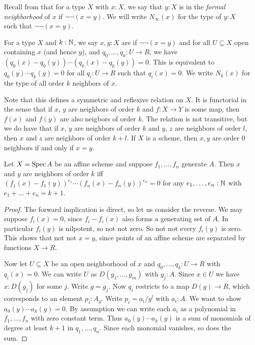 Recall from \cite{draft} that for a type $X$ with $x : X$, we say that $y : X$ is in the
\emph{formal neighborhood} of $x$ if $\neg \neg (x = y)$.
We will write $N_\infty(x)$ for the type of $y : X$ such that $\neg \neg(x = y)$.

\begin{definition}
For a type $X$ and $k : \mathbb{N}$, we say $x, y : X$ are 
if $\neg \neg (x = y)$ and for all $U \subseteq X$ open containing $x$ (and hence $y$), 
and $q_0,\ldots,q_k : U \to R$,
we have $(q_0(x) - q_0(y))\cdots (q_k(x)-q_k(y)) = 0$.
This is equivalent to $q_0(y)\cdots q_k(y) = 0$ for all $q_i : U \to R$ such that $q_i(x) = 0$.
We write $N_k(x)$ for the type of all order $k$ neighbors of $x$.
\end{definition}
Note that this defines a symmetric and reflexive relation on $X$. It is functorial in the
sense that if $x$, $y$ are neighbors of order $k$ and $f : X \to Y$ is some map,
then $f(x)$ and $f(y)$ are also neigbors of order $k$.
The relation is not transitive, but we do have that if $x$, $y$ are neighbors of order
$k$ and $y$, $z$ are neighbors of order $l$, then $x$ and $z$ are neighbors of order
$k+l$. If $X$ is a scheme, then $x,y$ are order $0$ neighbors if and only if $x = y$.

\begin{lemma}\label{neighbor-criterion}
Let $X = \operatorname{Spec} A$ be an affine scheme and suppose $f_1,\ldots,f_n$ generate $A$.
Then $x$ and $y$ are neighbors of order $k$ iff 
$(f_1(x) - f_1(y))^{e_1} \cdots (f_n(x) - f_n(y))^{e_n} = 0$ for any $e_1,\ldots,e_n : \mathbb{N}$
with $e_1 + \ldots + e_n = k+1$.
\end{lemma}
\begin{proof}
The forward implication is direct, so let us consider the reverse.
We may suppose $f_i(x) = 0$, since $f_i - f_i(x)$ also forms a generating set of $A$.
In particular $f_i(y)$ is nilpotent, so not not zero.
So not not every $f_i(y)$ is zero. This shows that not not $x = y$, since
points of an affine scheme are separated by functions $X \to R$.

Now let $U \subseteq X$ be an open neighborhood of $x$ and $q_0,\ldots,q_k : U \to R$
with $q_i(x) = 0$.
We can write $U$ as $D(g_1,\ldots,g_m)$ with $g_j : A$.
Since $x \in U$ we have $x : D(g_j)$ for some $j$.
Write $g = g_j$.
Now $q_i$ restricts to a map $D(g) \to R$, which corresponds to an element
$p_i : A_g$. Write $p_i = a_i/{g^l}$ with $a_i : A$.
We want to show $a_0(y)\cdots a_k(y) = 0$.
By assumption we can write each $a_i$ as a polynomial in $f_1,\ldots,f_n$
with zero constant term. Thus $a_0(y)\cdots a_k(y)$ is a sum of monomials of degree
at least $k+1$ in $q_1,\ldots,q_n$. Since each monomial vanishes, so does the sum.
\end{proof}

